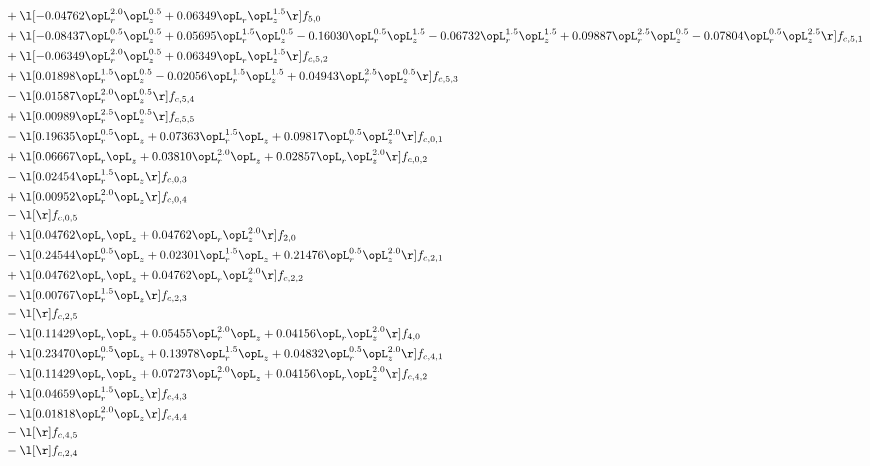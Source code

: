 \begin{alignat}{2}
& + \l[  -0.04762 \opL_r^{2.0} \opL_z^{0.5} +  0.06349 \opL_r \opL_z^{1.5}  \r] f_{5,0} \nonumber \\ 
& + \l[  -0.08437 \opL_r^{0.5} \opL_z^{0.5} +  0.05695 \opL_r^{1.5} \opL_z^{0.5}   -0.16030 \opL_r^{0.5} \opL_z^{1.5}   -0.06732 \opL_r^{1.5} \opL_z^{1.5} +  0.09887 \opL_r^{2.5} \opL_z^{0.5}   -0.07804 \opL_r^{0.5} \opL_z^{2.5}  \r] f_{c,5,1} \nonumber \\ 
& + \l[  -0.06349 \opL_r^{2.0} \opL_z^{0.5} +  0.06349 \opL_r \opL_z^{1.5}  \r] f_{c,5,2} \nonumber \\ 
& + \l[  0.01898 \opL_r^{1.5} \opL_z^{0.5}   -0.02056 \opL_r^{1.5} \opL_z^{1.5} +  0.04943 \opL_r^{2.5} \opL_z^{0.5}  \r] f_{c,5,3} \nonumber \\ 
& - \l[  0.01587 \opL_r^{2.0} \opL_z^{0.5}  \r] f_{c,5,4} \nonumber \\ 
& + \l[  0.00989 \opL_r^{2.5} \opL_z^{0.5}  \r] f_{c,5,5} \nonumber \\ 
& - \l[  0.19635 \opL_r^{0.5} \opL_z +  0.07363 \opL_r^{1.5} \opL_z +  0.09817 \opL_r^{0.5} \opL_z^{2.0}  \r] f_{c,0,1} \nonumber \\ 
& + \l[  0.06667 \opL_r \opL_z +  0.03810 \opL_r^{2.0} \opL_z +  0.02857 \opL_r \opL_z^{2.0}  \r] f_{c,0,2} \nonumber \\ 
& - \l[  0.02454 \opL_r^{1.5} \opL_z  \r] f_{c,0,3} \nonumber \\ 
& + \l[  0.00952 \opL_r^{2.0} \opL_z  \r] f_{c,0,4} \nonumber \\ 
& - \l[  \r] f_{c,0,5} \nonumber \\ 
& + \l[  0.04762 \opL_r \opL_z +  0.04762 \opL_r \opL_z^{2.0}  \r] f_{2,0} \nonumber \\ 
& - \l[  0.24544 \opL_r^{0.5} \opL_z +  0.02301 \opL_r^{1.5} \opL_z +  0.21476 \opL_r^{0.5} \opL_z^{2.0}  \r] f_{c,2,1} \nonumber \\ 
& + \l[  0.04762 \opL_r \opL_z +  0.04762 \opL_r \opL_z^{2.0}  \r] f_{c,2,2} \nonumber \\ 
& - \l[  0.00767 \opL_r^{1.5} \opL_z  \r] f_{c,2,3} \nonumber \\ 
& - \l[  \r] f_{c,2,5} \nonumber \\ 
& - \l[  0.11429 \opL_r \opL_z +  0.05455 \opL_r^{2.0} \opL_z +  0.04156 \opL_r \opL_z^{2.0}  \r] f_{4,0} \nonumber \\ 
& + \l[  0.23470 \opL_r^{0.5} \opL_z +  0.13978 \opL_r^{1.5} \opL_z +  0.04832 \opL_r^{0.5} \opL_z^{2.0}  \r] f_{c,4,1} \nonumber \\ 
& - \l[  0.11429 \opL_r \opL_z +  0.07273 \opL_r^{2.0} \opL_z +  0.04156 \opL_r \opL_z^{2.0}  \r] f_{c,4,2} \nonumber \\ 
& + \l[  0.04659 \opL_r^{1.5} \opL_z  \r] f_{c,4,3} \nonumber \\ 
& - \l[  0.01818 \opL_r^{2.0} \opL_z  \r] f_{c,4,4} \nonumber \\ 
& - \l[  \r] f_{c,4,5} \nonumber \\ 
& - \l[  \r] f_{c,2,4} \nonumber \\ 
\end{alignat} 


